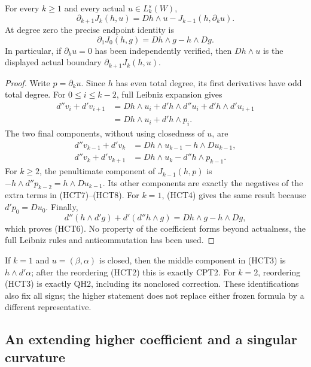 \begin{theorem}
For every $k\ge1$ and every actual $u\in L_k^s(W)$,
\[
 \partial_{k+1}J_k(h,u)
       =Dh\wedge u-J_{k-1}(h,\partial_k u).
 \tag{HCT5}
\]
At degree zero the precise endpoint identity is
\[
                  \partial_1J_0(h,g)=Dh\wedge g-h\wedge Dg.
 \tag{HCT6}
\]
In particular, if $\partial_k u=0$ has been independently verified,
then $Dh\wedge u$ is the displayed actual boundary
$\partial_{k+1}J_k(h,u)$.
\end{theorem}

\begin{proof}
Write $p=\partial_k u$.  Since $h$ has even total degree, its first
derivatives have odd total degree.  For $0\le i\le k-2$, full
Leibniz expansion gives
\[
 \begin{split}
 d''v_i+d'v_{i+1}
 &=Dh\wedge u_i+d'h\wedge d''u_i+d'h\wedge d'u_{i+1}\\
 &=Dh\wedge u_i+d'h\wedge p_i.
 \end{split}
 \tag{HCT7}
\]
The two final components, without using closedness of $u$, are
\[
 \begin{split}
 d''v_{k-1}+d'v_k&=Dh\wedge u_{k-1}-h\wedge Du_{k-1},\\
 d''v_k+d'v_{k+1}&=Dh\wedge u_k-d''h\wedge p_{k-1}.
 \end{split}
 \tag{HCT8}
\]
For $k\ge2$, the penultimate component of $J_{k-1}(h,p)$ is
$-h\wedge d''p_{k-2}=h\wedge Du_{k-1}$.  Its other components
are exactly the negatives of the extra terms in (HCT7)--(HCT8).
For $k=1$, (HCT4) gives the same result because
$d'p_0=Du_0$.  Finally,
\[
 d''(h\wedge d'g)+d'(d''h\wedge g)
             =Dh\wedge g-h\wedge Dg,
 \tag{HCT9}
\]
which proves (HCT6).  No property of the coefficient forms beyond
actualness, the full Leibniz rules and anticommutation has been used.
\end{proof}

If $k=1$ and $u=(\beta,\alpha)$ is closed, then the middle
component in (HCT3) is $h\wedge d'\alpha$; after the reordering
(HCT2) this is exactly CPT2.  For $k=2$, reordering (HCT3) is
exactly QH2, including its nonclosed correction.  These identifications
also fix all signs; the higher statement does not replace either
frozen formula by a different representative.

\subsection{An extending higher coefficient and a singular curvature}

